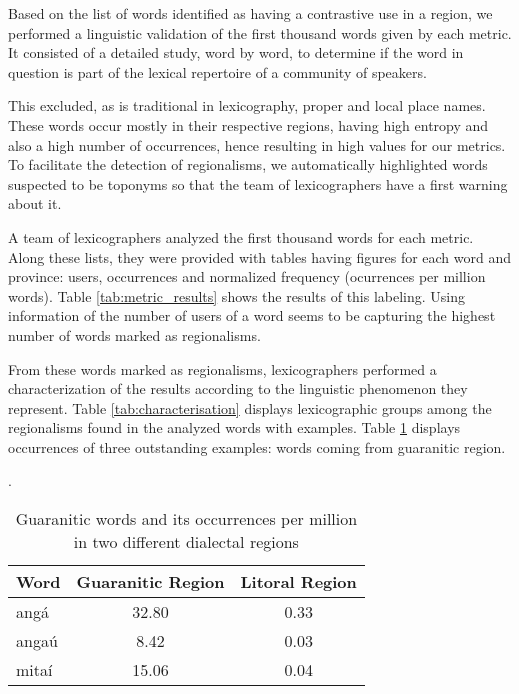 
\label{palabras_candidatas}





Based on the list of words identified as having a contrastive use in a region, we performed a linguistic validation of the first thousand words given by each metric. It consisted of a detailed study, word by word, to determine if the word in question is part of the lexical repertoire of a community of speakers. 

This excluded, as is traditional in lexicography, proper and local place names. These words occur mostly in their respective regions, having high entropy and also a high number of occurrences, hence resulting in high values for our metrics. To facilitate the detection of regionalisms, we automatically highlighted words suspected to be toponyms so that the team of lexicographers have a first warning about it.

A team of lexicographers analyzed the first thousand words for each metric. Along these lists, they were provided with tables having figures for each word and province: users, occurrences and normalized frequency (ocurrences per million words). Table \ref{tab:metric_results} shows the results of this labeling. Using information of the number of users of a word seems to be capturing the highest number of words marked as regionalisms. 

From these words marked as regionalisms, lexicographers performed a characterization of the results according to the linguistic phenomenon they represent. Table \ref{tab:characterisation} displays lexicographic groups among the regionalisms found in the analyzed words with examples. Table \ref{tab:guaranitic} displays occurrences of three outstanding examples: words coming from guaranitic region.

. 



\begin{table}[hb]
    \centering
    \begin{tabular}{l c c}
    Word & Guaranitic Region & Litoral Region \\
    \hline
    angá & 32.80 & 0.33 \\
    angaú & 8.42 & 0.03 \\
    mitaí & 15.06 & 0.04 \\
    \hline
    \end{tabular}
    \caption{Guaranitic words and its occurrences per million in two different dialectal regions}
    \label{tab:guaranitic}
\end{table}




